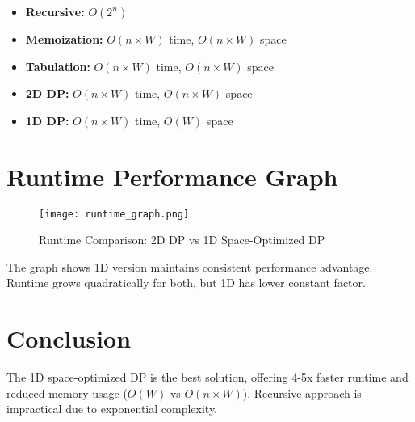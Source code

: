 \documentclass[12pt]{article}
\begin{document}
\begin{itemize}
    \item \textbf{Recursive:} $O(2^n)$
    \item \textbf{Memoization:} $O(n \times W)$ time, $O(n \times W)$ space
    \item \textbf{Tabulation:} $O(n \times W)$ time, $O(n \times W)$ space
    \item \textbf{2D DP:} $O(n \times W)$ time, $O(n \times W)$ space
    \item \textbf{1D DP:} $O(n \times W)$ time, $O(W)$ space
\end{itemize}

\newpage
\section{Runtime Performance Graph}

\begin{figure}[h]
\centering
\texttt{[image: runtime\_graph.png]}
\caption{Runtime Comparison: 2D DP vs 1D Space-Optimized DP}
\label{fig:runtime_graph}
\end{figure}

The graph shows 1D version maintains consistent performance advantage. Runtime grows quadratically for both, but 1D has lower constant factor.

\section{Conclusion}

The 1D space-optimized DP is the best solution, offering 4-5x faster runtime and reduced memory usage ($O(W)$ vs $O(n \times W)$). Recursive approach is impractical due to exponential complexity.


\end{document}
